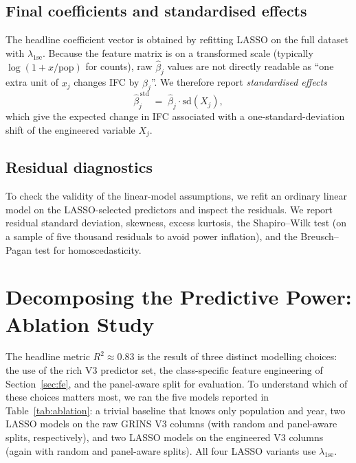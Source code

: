 \documentclass[11pt,a4paper]{article}
\begin{document}
\subsection{Final coefficients and standardised effects}

The headline coefficient vector is obtained by refitting LASSO on the
full dataset with \(\lambda_{\mathrm{1se}}\). Because the feature
matrix is on a transformed scale (typically \(\log(1+x/\text{pop})\)
for counts), raw \(\hat{\beta}_{j}\) values are not directly readable
as ``one extra unit of \(x_{j}\) changes IFC by \(\hat{\beta}_{j}\)''.
We therefore report \emph{standardised effects}
\begin{equation}
  \hat{\beta}_{j}^{\,\text{std}}
  \;=\;
  \hat{\beta}_{j} \cdot \mathrm{sd}(X_{j}),
  \label{eq:stdeff}
\end{equation}
which give the expected change in IFC associated with a
one-standard-deviation shift of the engineered variable
\(X_{j}\).

\subsection{Residual diagnostics}

To check the validity of the linear-model assumptions, we refit an
ordinary linear model on the LASSO-selected predictors and inspect
the residuals. We report residual standard deviation, skewness,
excess kurtosis, the Shapiro--Wilk test (on a sample of five
thousand residuals to avoid power inflation), and the Breusch--Pagan
test for homoscedasticity.

\section{Decomposing the Predictive Power: Ablation Study}
\label{sec:ablation}

The headline metric \(R^{2}\approx 0.83\) is the result of three
distinct modelling choices: the use of the rich V3 predictor set, the
class-specific feature engineering of Section~\ref{sec:fe}, and the
panel-aware split for evaluation. To understand which of these choices
matters most, we ran the five models reported in
Table~\ref{tab:ablation}: a trivial baseline that knows only
population and year, two LASSO models on the raw GRINS V3 columns
(with random and panel-aware splits, respectively), and two LASSO
models on the engineered V3 columns (again with random and panel-aware
splits). All four LASSO variants use \(\lambda_{\mathrm{1se}}\).
\end{document}
